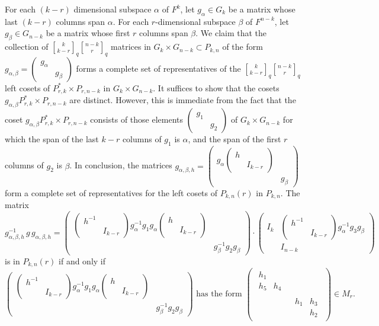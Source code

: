 \documentclass[reqno]{amsart}
\theoremstyle{definition}
\theoremstyle{remark}
\numberwithin{equation}{section}
\newcommand{\stirling}[2]{\genfrac{[}{]}{0pt}{1}{#1}{#2}}
\newcommand{\bbsm}{\left (\begin{smallmatrix}}      \newcommand{\besm}{\end{smallmatrix}\right )}
\newcommand{\bbm}{\begin{pmatrix}}      \newcommand{\bem}{\end{pmatrix}}
\begin{document}
For each $(k-r)$ dimensional subspace $\alpha$ of $F^k$, let $g_\alpha \in G_k$ be a matrix whose last $(k-r)$ columns span $\alpha$. For each $r$-dimensional subspace $\beta$ of $F^{n-k}$, let $g_\beta \in G_{n-k}$ be a matrix whose first $r$ columns span $\beta$. We claim that the collection of $\stirling{k}{k-r}_q \stirling{n-k}{r}_q$ matrices in $G_k \times G_{n-k} \subset P_{k,n}$ of the form  $g_{\alpha,\beta}=\bbsm  g_\alpha   & \\& g_\beta \besm$ 
forms a complete set of representatives of the  $\stirling{k}{k-r}_q \stirling{n-k}{r}_q$ left cosets of $P^*_{r,k} \times P_{r,n-k}$ in $G_k\times G_{n-k}$. It  suffices to show that the cosets $g_{\alpha, \beta} P^*_{r,k} \times P_{r,n-k}$  are distinct. However, this is immediate from the fact that the coset $g_{\alpha, \beta} P^*_{r,k} \times P_{r,n-k}$ consists of those elements $\bbsm g_1 &\\ & g_2 \besm $ of $G_k \times G_{n-k}$ for which the span of the last $k-r$ columns of $g_1$ is $\alpha$, and the span of the first $r$ columns of $g_2$ is $\beta$. In conclusion, the matrices $g_{\alpha,\beta, h}=\bbsm g_\alpha \bbsm h &\\&I_{k-r} \besm & \\& g_\beta \besm $ form a complete set of representatives for the left cosets of $P_{k,n}(r)$ in $P_{k,n}$. 
The matrix 
\[ g_{\alpha,\beta, h}^{-1} \,g \,g_{\alpha,\beta, h}= \bbm  \bbsm h^{-1} & \\ & I_{k-r} \besm g_\alpha^{-1} g_1 g_\alpha \bbsm h &\\&I_{k-r} \besm &   \\ & g_\beta^{-1} g_2 g_\beta \bem  \cdot \bbm I_k & \bbsm h^{-1} & \\ & I_{k-r} \besm g_\alpha^{-1} g_3 g_\beta \\ & I_{n-k} \bem 
\]
is in $P_{k,n}(r)$ if and only if 
\[  \bbm  \bbsm h^{-1} & \\ & I_{k-r} \besm g_\alpha^{-1} g_1 g_\alpha \bbsm h &\\&I_{k-r} \besm &   \\ & g_\beta^{-1} g_2 g_\beta \bem \text{ has the form }
\bbsm \begin{smallmatrix}
h_1 &\\h_5 &h_4 \end{smallmatrix} & \\ & \begin{smallmatrix}
h_1 &h_3\\ &h_2 \end{smallmatrix}\besm  \in M_r.\]
\end{document}
